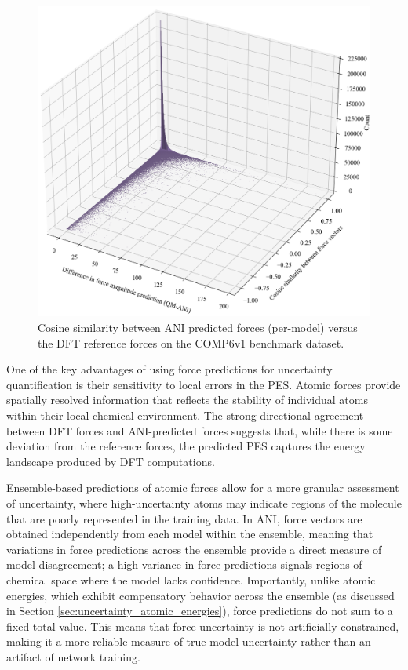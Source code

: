 \begin{figure}[H]
    \centering
    \includegraphics[width=1\linewidth]{Images/2xr_forces/2xr_comp6v1_force-cosine_sim-bar3d.png}
    \caption[3D histogram of cosine similarity measure of predicted atomic force vectors]{
    Cosine similarity between ANI predicted forces (per-model) versus the DFT reference forces on the COMP6v1 benchmark dataset.
    }
    \label{fig:2xr_comp6v1-forces-cos_sim}
\end{figure}


One of the key advantages of using force predictions for uncertainty quantification is their sensitivity to local errors in the PES. 
Atomic forces provide spatially resolved information that reflects the stability of individual atoms within their local chemical environment. 
The strong directional agreement between DFT forces and ANI-predicted forces suggests that, while there is some deviation from the reference forces, the predicted PES captures the energy landscape produced by DFT computations.

Ensemble-based predictions of atomic forces allow for a more granular assessment of uncertainty, where high-uncertainty atoms may indicate regions of the molecule that are poorly represented in the training data. 
In ANI, force vectors are obtained independently from each model within the ensemble, meaning that variations in force predictions across the ensemble provide a direct measure of model disagreement; a high variance in force predictions signals regions of chemical space where the model lacks confidence.
Importantly, unlike atomic energies, which exhibit compensatory behavior across the ensemble (as discussed in Section \ref{sec:uncertainty_atomic_energies}), force predictions do not sum to a fixed total value. 
This means that force uncertainty is not artificially constrained, making it a more reliable measure of true model uncertainty rather than an artifact of network training.

